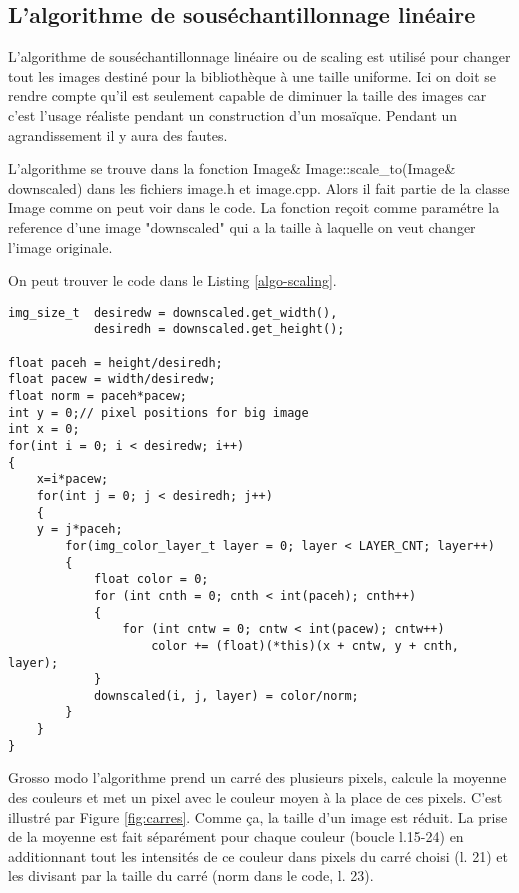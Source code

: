 \documentclass[a4paper]{article}
\begin{document}
\subsection{L'algorithme de sous\'echantillonnage lin\'eaire}

L'algorithme de sous\'echantillonnage lin\'eaire ou de scaling est utilis\'e pour changer tout les images destin\'e pour la bibliothèque \`a une taille uniforme.
Ici on doit se rendre compte qu'il est seulement capable de diminuer la taille des images car c'est l'usage r\'ealiste pendant un construction d'un mosa\"{i}que.  
Pendant un agrandissement il y aura des fautes.

L'algorithme se trouve dans la fonction Image\& Image::scale\_to(Image\& downscaled) dans les fichiers image.h et image.cpp.
Alors il fait partie de la classe Image comme on peut voir dans le code.
La fonction re\c{c}oit comme param\'etre la reference d'une image "downscaled" qui a la taille \`a laquelle on veut changer l'image originale.

On peut trouver le code dans le Listing \ref{algo-scaling}.
\begin{lstlisting}
img_size_t	desiredw = downscaled.get_width(),
			desiredh = downscaled.get_height();

float paceh = height/desiredh;
float pacew = width/desiredw;
float norm = paceh*pacew;
int y = 0;// pixel positions for big image
int x = 0;
for(int i = 0; i < desiredw; i++)
{
	x=i*pacew;
	for(int j = 0; j < desiredh; j++)
	{
	y = j*paceh;
		for(img_color_layer_t layer = 0; layer < LAYER_CNT; layer++)
		{
			float color = 0;
			for (int cnth = 0; cnth < int(paceh); cnth++)
			{
				for (int cntw = 0; cntw < int(pacew); cntw++)
					color += (float)(*this)(x + cntw, y + cnth, layer);
			}
			downscaled(i, j, layer) = color/norm;
		}
	}	
}
\end{lstlisting}

 Grosso modo l'algorithme prend un carr\'e des plusieurs pixels, calcule la moyenne des couleurs et met un pixel avec le couleur moyen \`a la place de ces pixels.
C'est illustr\'e par Figure \ref{fig:carres}.
Comme \c{c}a, la taille d'un image est r\'eduit.
La prise de la moyenne est fait s\'epar\'ement pour  chaque couleur (boucle l.15-24) en additionnant tout les intensit\'es de ce couleur dans pixels du carr\'e choisi (l. 21) et les divisant par la taille du carr\'e (norm dans le code, l. 23).
\end{document}
